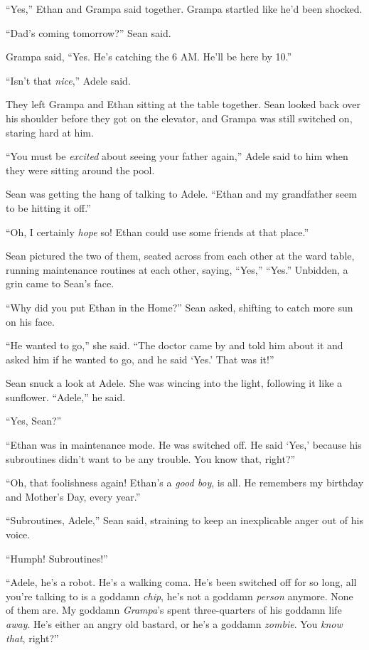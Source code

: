 “Yes,” Ethan and Grampa said together. Grampa startled like he'd 
been shocked.

“Dad's coming tomorrow?” Sean said.

Grampa said, “Yes. He's catching the 6 AM. He'll be here by 10.”

“Isn't that \emph{nice},” Adele said.

\tb

They left Grampa and Ethan sitting at the table together. Sean looked 
back over his shoulder before they got on the elevator, and Grampa was 
still switched on, staring hard at him.

“You must be \emph{excited} about seeing your father again,” Adele 
said to him when they were sitting around the pool.

Sean was getting the hang of talking to Adele. “Ethan and my 
grandfather seem to be hitting it off.”

“Oh, I certainly \emph{hope} so! Ethan could use some friends at that 
place.”

Sean pictured the two of them, seated across from each other at the 
ward table, running maintenance routines at each other, saying, 
“Yes,” “Yes.” Unbidden, a grin came to Sean's face.

“Why did you put Ethan in the Home?” Sean asked, shifting to catch 
more sun on his face.

“He wanted to go,” she said. “The doctor came by and told him 
about it and asked him if he wanted to go, and he said `Yes.' That was 
it!”

Sean snuck a look at Adele. She was wincing into the light, following 
it like a sunflower. “Adele,” he said.

“Yes, Sean?”

“Ethan was in maintenance mode. He was switched off. He said `Yes,' 
because his subroutines didn't want to be any trouble. You know that, 
right?”

“Oh, that foolishness again! Ethan's a \emph{good boy}, is all. He 
remembers my birthday and Mother's Day, every year.”

“Subroutines, Adele,” Sean said, straining to keep an inexplicable 
anger out of his voice.

“Humph! Subroutines!”

“Adele, he's a robot. He's a walking coma. He's been switched off for 
so long, all you're talking to is a goddamn \emph{chip}, he's not a 
goddamn \emph{person} anymore. None of them are. My goddamn 
\emph{Grampa}'s spent three-quarters of his goddamn life \emph{away}. 
He's either an angry old bastard, or he's a goddamn \emph{zombie}. You 
\emph{know that}, right?”

